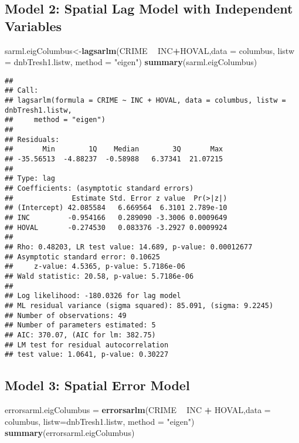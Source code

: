 \documentclass[
]{book}
\newenvironment{Shaded}{\begin{snugshade}}{\end{snugshade}}
\newcommand{\DataTypeTok}[1]{\textcolor[rgb]{0.13,0.29,0.53}{#1}}
\newcommand{\KeywordTok}[1]{\textcolor[rgb]{0.13,0.29,0.53}{\textbf{#1}}}
\newcommand{\NormalTok}[1]{#1}
\newcommand{\OperatorTok}[1]{\textcolor[rgb]{0.81,0.36,0.00}{\textbf{#1}}}
\newcommand{\StringTok}[1]{\textcolor[rgb]{0.31,0.60,0.02}{#1}}
\begin{document}
\hypertarget{model-2-spatial-lag-model-with-independent-variables}{%
\subsection{Model 2: Spatial Lag Model with Independent Variables}\label{model-2-spatial-lag-model-with-independent-variables}}

\begin{Shaded}
\begin{Highlighting}[]
\NormalTok{sarml.eigColumbus<-}\KeywordTok{lagsarlm}\NormalTok{(CRIME }\OperatorTok{~}\StringTok{ }\NormalTok{INC}\OperatorTok{+}\NormalTok{HOVAL,}\DataTypeTok{data =}\NormalTok{ columbus, }
                            \DataTypeTok{listw =}\NormalTok{ dnbTresh1.listw, }\DataTypeTok{method =} \StringTok{"eigen"}\NormalTok{)}
\KeywordTok{summary}\NormalTok{(sarml.eigColumbus)}
\end{Highlighting}
\end{Shaded}

\begin{verbatim}
## 
## Call:
## lagsarlm(formula = CRIME ~ INC + HOVAL, data = columbus, listw = dnbTresh1.listw, 
##     method = "eigen")
## 
## Residuals:
##       Min        1Q    Median        3Q       Max 
## -35.56513  -4.88237  -0.58988   6.37341  21.07215 
## 
## Type: lag 
## Coefficients: (asymptotic standard errors) 
##              Estimate Std. Error z value  Pr(>|z|)
## (Intercept) 42.085584   6.669564  6.3101 2.789e-10
## INC         -0.954166   0.289090 -3.3006 0.0009649
## HOVAL       -0.274530   0.083376 -3.2927 0.0009924
## 
## Rho: 0.48203, LR test value: 14.689, p-value: 0.00012677
## Asymptotic standard error: 0.10625
##     z-value: 4.5365, p-value: 5.7186e-06
## Wald statistic: 20.58, p-value: 5.7186e-06
## 
## Log likelihood: -180.0326 for lag model
## ML residual variance (sigma squared): 85.091, (sigma: 9.2245)
## Number of observations: 49 
## Number of parameters estimated: 5 
## AIC: 370.07, (AIC for lm: 382.75)
## LM test for residual autocorrelation
## test value: 1.0641, p-value: 0.30227
\end{verbatim}

\hypertarget{model-3-spatial-error-model}{%
\subsection{Model 3: Spatial Error Model}\label{model-3-spatial-error-model}}

\begin{Shaded}
\begin{Highlighting}[]
\NormalTok{errorsarml.eigColumbus =}\StringTok{ }\KeywordTok{errorsarlm}\NormalTok{(CRIME }\OperatorTok{~}\StringTok{ }\NormalTok{INC }\OperatorTok{+}\StringTok{ }\NormalTok{HOVAL,}\DataTypeTok{data =}\NormalTok{ columbus,}
                                    \DataTypeTok{listw=}\NormalTok{dnbTresh1.listw, }\DataTypeTok{method =} \StringTok{"eigen"}\NormalTok{)}
\KeywordTok{summary}\NormalTok{(errorsarml.eigColumbus)}
\end{Highlighting}
\end{Shaded}
\end{document}
